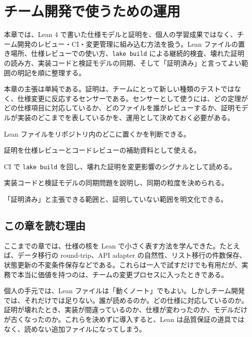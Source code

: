 \chapter{チーム開発で使うための運用}
\label{chap:team-operations}

\begin{chapterabstract}
本章では、Lean 4 で書いた仕様モデルと証明を、個人の学習成果ではなく、チーム開発のレビュー・CI・変更管理に組み込む方法を扱う。Lean ファイルの置き場所、仕様レビューでの使い方、\texttt{lake build} による継続的検査、壊れた証明の読み方、実装コードと検証モデルの同期、そして「証明済み」と言ってよい範囲の明記を順に整理する。

本章の主張は単純である。証明は、チームにとって新しい種類のテストではなく、仕様変更に反応するセンサーである。センサーとして使うには、どの定理がどの仕様項目に対応しているか、どのファイルを誰がレビューするか、証明モデルが実装のどこまでを表しているかを、運用として決めておく必要がある。
\end{chapterabstract}

\begin{learninggoals}
\item Lean ファイルをリポジトリ内のどこに置くかを判断できる。
\item 証明を仕様レビューとコードレビューの補助資料として使える。
\item CI で \texttt{lake build} を回し、壊れた証明を変更影響のシグナルとして読める。
\item 実装コードと検証モデルの同期問題を説明し、同期の粒度を決められる。
\item 「証明済み」と主張できる範囲と、証明していない範囲を明文化できる。
\end{learninggoals}

\section{この章を読む理由}

ここまでの章では、仕様の核を Lean で小さく表す方法を学んできた。たとえば、データ移行の round-trip、API adapter の自然性、リスト移行の件数保存、状態更新の不変条件保存などである。これらは一人で試すだけでも有用だが、実務で本当に価値を持つのは、チームの変更プロセスに入ったときである。

個人の手元では、Lean ファイルは「動くノート」でもよい。しかしチーム開発では、それだけでは足りない。誰が読めるのか。どの仕様に対応しているのか。証明が壊れたとき、実装が間違っているのか、仕様が変わったのか、モデルだけが古くなったのか。これらを決めずに導入すると、Lean は品質保証の道具ではなく、読めない追加ファイルになってしまう。


